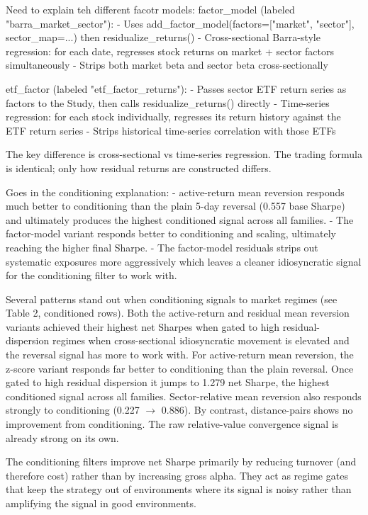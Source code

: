 Need to explain teh different facotr models:
factor_model (labeled "barra_market_sector"):
  - Uses add_factor_model(factors=["market", "sector"], sector_map=...) then residualize_returns()
  - Cross-sectional Barra-style regression: for each date, regresses stock returns on market + sector factors simultaneously
  - Strips both market beta and sector beta cross-sectionally

etf_factor (labeled "etf_factor_returns"):
- Passes sector ETF return series as factors to the Study, then calls residualize_returns() directly
- Time-series regression: for each stock individually, regresses its return history against the ETF return series
- Strips historical time-series correlation with those ETFs

The key difference is cross-sectional vs time-series regression. The trading formula is identical; only how residual returns are constructed differs.


Goes in the conditioning explanation:
- active-return mean reversion responds much better to conditioning than the plain 5-day reversal (0.557 base Sharpe) and ultimately produces the highest conditioned signal across all families.
- The factor-model variant responds better to conditioning and scaling, ultimately reaching the higher final Sharpe.
- The factor-model residuals strips out systematic exposures more aggressively which leaves a cleaner idiosyncratic signal for the conditioning filter to work with.

Several patterns stand out when conditioning signals to market regimes (see Table 2, conditioned rows). Both the active-return and residual mean reversion variants achieved their highest net Sharpes when gated to high residual-dispersion regimes when cross-sectional idiosyncratic movement is elevated and the reversal signal has more to work with. For active-return mean reversion, the z-score variant responds far better to conditioning than the plain reversal. Once gated to high residual dispersion it jumps to 1.279 net Sharpe, the highest conditioned signal across all families. Sector-relative mean reversion also responds strongly to conditioning (0.227 $\to$ 0.886). By contrast, distance-pairs shows no improvement from conditioning. The raw relative-value convergence signal is already strong on its own.

The conditioning filters improve net Sharpe primarily by reducing turnover (and therefore cost) rather than by increasing gross alpha. They act as regime gates that keep the strategy out of environments where its signal is noisy rather than amplifying the signal in good environments.


